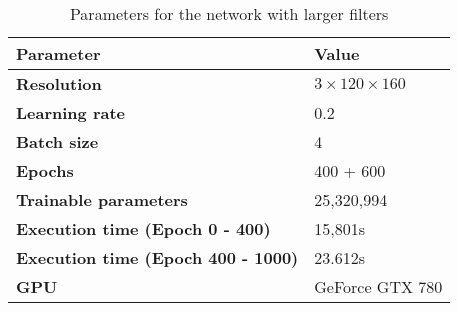 \begin{table}[h!]
	\footnotesize
	\centering
	\begin{tabular}{ll}
	\hline
		\textbf{Parameter} & \textbf{Value}\\
	\hline
	\hline
		\textbf{Resolution} & $3 \times 120\times160$\\
		\textbf{Learning rate} & 0.2\\
		\textbf{Batch size} & 4\\
		\textbf{Epochs} & 400 + 600\\
		\textbf{Trainable parameters} & 25,320,994\\
		\textbf{Execution time (Epoch 0 - 400)} & 15,801s\\
		\textbf{Execution time (Epoch 400 - 1000)} & 23.612s\\
		\textbf{GPU} & GeForce GTX 780\\
	\hline
	\end{tabular}
	\caption{Parameters for the network with larger filters}
	\label{tab:cnn_params_largerfilters}
\end{table}
